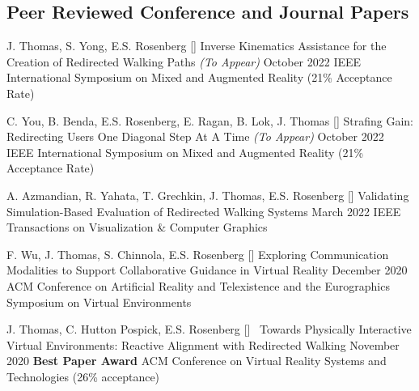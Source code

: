 

\begin{cventries}
  \vspace{-.75cm}
  \subsection*{Peer Reviewed Conference and Journal Papers}

  \cventry
    {J. Thomas, S. Yong, E.S. Rosenberg} %
    {[\thenpubs] Inverse Kinematics Assistance for the Creation of Redirected Walking Paths \textit{(To Appear)}} %
    {October 2022} %
    {} %
    {IEEE International Symposium on Mixed and Augmented Reality (21\% Acceptance Rate)} %
  
  \cventry
    {C. You, B. Benda, E.S. Rosenberg, E. Ragan, B. Lok, J. Thomas} %
    {[\thenpubs] Strafing Gain: Redirecting Users One Diagonal Step At A Time \textit{(To Appear)}} %
    {October 2022} %
    {} %
    {IEEE International Symposium on Mixed and Augmented Reality (21\% Acceptance Rate)} %

  \cventry
    {A. Azmandian, R. Yahata, T. Grechkin, J. Thomas, E.S. Rosenberg} %
    {[\thenpubs] Validating Simulation-Based Evaluation of Redirected Walking Systems} %
    {March 2022} %
    {} %
    {IEEE Transactions on Visualization \& Computer Graphics}%
    
  \cventry
    {F. Wu, J. Thomas, S. Chinnola, E.S. Rosenberg} %
    {[\thenpubs] Exploring Communication Modalities to Support Collaborative Guidance in Virtual Reality} %
    {December 2020} %
    {} %
    {ACM Conference on Artificial Reality and Telexistence and the Eurographics Symposium on Virtual Environments}%
    
  \cventry
    {J. Thomas, C. Hutton Pospick, E.S. Rosenberg} %
    {[\thenpubs]\ \textcolor{awesome}{\faTrophy} Towards Physically Interactive Virtual Environments: Reactive Alignment with Redirected Walking} %
    {November 2020} %
    {\textbf{Best Paper Award}} %
    {ACM Conference on Virtual Reality Systems and Technologies (26\% acceptance)}%
    

\end{cventries}
